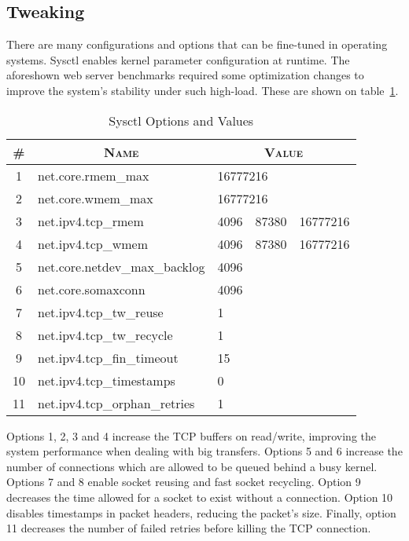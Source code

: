 \subsection{Tweaking}
There are many configurations and options that can be fine-tuned in operating systems. Sysctl enables kernel parameter configuration at runtime. The aforeshown web server benchmarks required some optimization changes to improve the system's stability under such high-load. These are shown on table~\ref{tab:sysctl}.
\begin{table}[ht]
  \centering
  \caption{Sysctl Options and Values}
  \label{tab:sysctl}
  
  \begin{tabular}{c|p{}|p{}}
  \multicolumn{1}{c|}{\textbf{\textsc{\#}}} & \multicolumn{1}{c|}{\textbf{\textsc{Name}}} & \multicolumn{1}{c}{\textbf{\textsc{Value}}} \\ \hline
  
  1 & net.core.rmem\_max & 16777216 \\ \hline
  2 & net.core.wmem\_max & 16777216 \\ \hline
  3 & net.ipv4.tcp\_rmem & 4096~\, 87380~\, 16777216 \\ \hline
  4 & net.ipv4.tcp\_wmem & 4096~\, 87380~\, 16777216 \\ \hline
  5 & net.core.netdev\_max\_backlog & 4096 \\ \hline
  6 & net.core.somaxconn & 4096 \\ \hline
  7 & net.ipv4.tcp\_tw\_reuse & 1 \\ \hline
  8 & net.ipv4.tcp\_tw\_recycle & 1 \\ \hline
  9 & net.ipv4.tcp\_fin\_timeout & 15 \\ \hline
  10 & net.ipv4.tcp\_timestamps & 0 \\ \hline
  11 & net.ipv4.tcp\_orphan\_retries & 1 \\
  
  \end{tabular}
\end{table}
Options 1, 2, 3 and 4 increase the TCP buffers on read/write, improving the system performance when dealing with big transfers. Options 5 and 6 increase the number of connections which are allowed to be queued behind a busy kernel. Options 7 and 8 enable socket reusing and fast socket recycling. Option 9 decreases the time allowed for a socket to exist without a connection. Option 10 disables timestamps in packet headers, reducing the packet's size. Finally, option 11 decreases the number of failed retries before killing the TCP connection.

